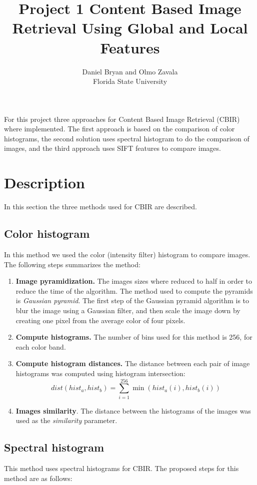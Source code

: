 \documentclass[a4paper,12pt]{article}
\title{Project 1 Content Based Image Retrieval Using Global and Local Features}
\author{Daniel Bryan and Olmo Zavala\\Florida State University}
\begin{document}
\maketitle

For this project three approaches for Content Based Image Retrieval  (CBIR)
where implemented. The first approach is based on the comparison of color 
histograms, the second solution uses spectral histogram to do the comparison
of images, and the third approach uses SIFT features to compare images. 

\section{Description}
In this section the three methods used for CBIR are described. 

\subsection{Color histogram}
\label{sec_colorhist}
In this method we used the color (intensity filter) histogram  to 
compare images. The following steps summarizes the method:
\begin{enumerate}
    \item \textbf{Image pyramidization. } The images sizes where reduced
        to half in order to reduce the time of the algorithm. The method used
        to compute the pyramids is \emph{Gaussian pyramid}. The first
        step of the Gaussian pyramid algorithm is to blur the image 
        using a Gaussian filter, and then scale the image down by 
        creating one pixel from the average color of four pixels.
    \item \textbf{Compute histograms.} The number of bins used
        for this method is 256, for each color band.
    \item \textbf{Compute histogram distances.} The distance between
        each pair of image histograms was computed using histogram intersection:
        \begin{equation}
            dist(hist_a,hist_b) = \sum_{i=1}^{256} \min( hist_a(i), hist_b(i))
        \end{equation}
    \item \textbf{Images similarity}. The distance between the histograms
        of the images was used as the \emph{similarity} parameter. 
\end{enumerate}

\subsection{Spectral histogram}
\label{sec_spechist}
This method uses spectral histograms for CBIR. The proposed steps
for this method are as follows:
\end{document}
